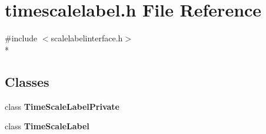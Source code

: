 \section{timescalelabel.\+h File Reference}
\label{scalelabels_2timescalelabel_8h}
{\ttfamily \#include $<$scalelabelinterface.\+h$>$}\\*
\subsection*{Classes}
\begin{DoxyCompactItemize}
\item 
class {\bf Time\+Scale\+Label\+Private}
\item 
class {\bf Time\+Scale\+Label}
\end{DoxyCompactItemize}
